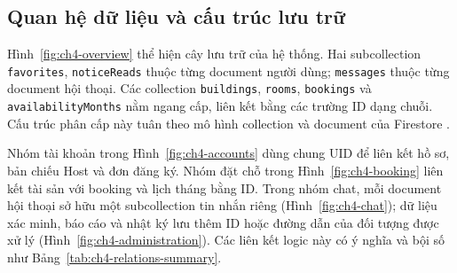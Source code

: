\subsection{Quan hệ dữ liệu và cấu trúc lưu trữ}
\label{sec:ch4-relationships}

Hình~\ref{fig:ch4-overview} thể hiện cây lưu trữ của hệ thống. Hai subcollection \texttt{favorites}, \texttt{notice\allowbreak{}Reads} thuộc từng document người dùng; \texttt{messages} thuộc từng document hội thoại. Các collection \texttt{buildings}, \texttt{rooms}, \texttt{bookings} và \texttt{availability\allowbreak{}Months} nằm ngang cấp, liên kết bằng các trường ID dạng chuỗi. Cấu trúc phân cấp này tuân theo mô hình collection và document của Firestore \parencite{firebase_data_model}.



Nhóm tài khoản trong Hình~\ref{fig:ch4-accounts} dùng chung UID để liên kết hồ sơ, bản chiếu Host và đơn đăng ký. Nhóm đặt chỗ trong Hình~\ref{fig:ch4-booking} liên kết tài sản với booking và lịch tháng bằng ID. Trong nhóm chat, mỗi document hội thoại sở hữu một subcollection tin nhắn riêng (Hình~\ref{fig:ch4-chat}); dữ liệu xác minh, báo cáo và nhật ký lưu thêm ID hoặc đường dẫn của đối tượng được xử lý (Hình~\ref{fig:ch4-administration}). Các liên kết logic này có ý nghĩa và bội số như Bảng~\ref{tab:ch4-relations-summary}.

